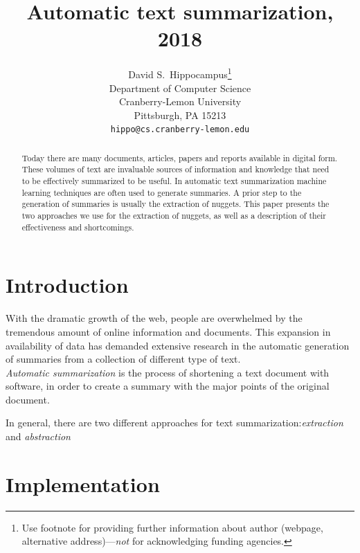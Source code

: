 \documentclass{article}
\title{Automatic text summarization, 2018}
\author{
  David S.~Hippocampus\thanks{Use footnote for providing further
    information about author (webpage, alternative
    address)---\emph{not} for acknowledging funding agencies.} \\
  Department of Computer Science\\
  Cranberry-Lemon University\\
  Pittsburgh, PA 15213 \\
  \texttt{hippo@cs.cranberry-lemon.edu} \\
}
\begin{document}

\maketitle

\begin{abstract}
  Today there are many documents, articles, papers and reports available in digital form. These volumes of text are invaluable sources of information and knowledge that need to be effectively summarized to be useful. In automatic text summarization machine learning techniques are often used to generate summaries. A prior step to the generation of summaries is usually the extraction of nuggets. This paper presents the two approaches we use for the extraction of nuggets, as well as a description of their effectiveness and shortcomings. 
  
\end{abstract}

\section{Introduction}
With the dramatic growth of the web, people are overwhelmed by the tremendous amount of online information and documents. This expansion in availability of data has demanded extensive research in the automatic generation of summaries from a collection of different type of text.\\

\textit{Automatic summarization} is the process of shortening a text document with software, in order to create a summary with the major points of the original document.	     

In general, there  are two different approaches for text summarization:\textit{extraction} and \textit{abstraction}


\section{Implementation}
\label{headings}
\end{document}
